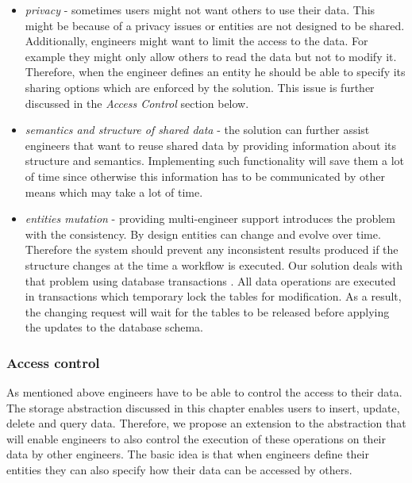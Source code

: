 \begin{itemize}

	\item \textit{privacy} - sometimes users might not want others to use their data. This might be because of a privacy issues or entities are not designed to be shared. Additionally, engineers might want to limit the access to the data. For example they might only allow others to read the data but not to modify it. Therefore, when the engineer defines an entity he should be able to specify its sharing options which are enforced by the solution. This issue is further discussed in the \textit{Access Control} section below.
	 
	\item \textit{semantics and structure of shared data} - the solution can further assist engineers that want to reuse shared data by providing information about its structure and semantics. Implementing such functionality will save them a lot of time since otherwise this information has to be communicated by other means which may take a lot of time.
	
	\item \textit{entities mutation} - providing multi-engineer support introduces the problem with the consistency. By design entities can change and evolve over time. Therefore the system should prevent any inconsistent results produced if the structure changes at the time a workflow is executed. Our solution deals with that problem using database transactions \cite{gray1981transaction}. All data operations are executed in transactions which temporary lock the tables for modification. As a result, the changing request will wait for the tables to be released before applying the updates to the database schema.
\end{itemize}


\subsubsection{Access control}

As mentioned above engineers have to be able to control the access to their data. The storage abstraction discussed in this chapter enables users to insert, update, delete and query data. Therefore, we propose an extension to the abstraction that will enable engineers to also control the execution of these operations on their data by other engineers. The basic idea is that when engineers define their entities they can also specify how their data can be accessed by others.

